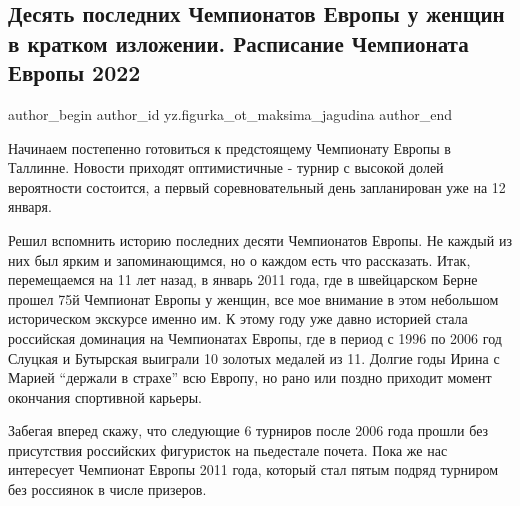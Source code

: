  
 
 
 
 
\subsection{Десять последних Чемпионатов Европы у женщин в кратком изложении. Расписание Чемпионата Европы 2022}
\label{sec:04_01_2022.yz.figurka_ot_maksima_jagudina.1.chempionaty_evropy}


\ifcmt
 author_begin
   author_id yz.figurka_ot_maksima_jagudina
 author_end
\fi

Начинаем постепенно готовиться к предстоящему Чемпионату Европы в Таллинне.
Новости приходят оптимистичные - турнир с высокой долей вероятности состоится,
а первый соревновательный день запланирован уже на 12 января.


Решил вспомнить историю последних десяти Чемпионатов Европы. Не каждый из них
был ярким и запоминающимся, но о каждом есть что рассказать. Итак, перемещаемся
на 11 лет назад, в январь 2011 года, где в швейцарском Берне прошел 75й
Чемпионат Европы у женщин, все мое внимание в этом небольшом историческом
экскурсе именно им. К этому году уже давно историей стала российская доминация
на Чемпионатах Европы, где в период с 1996 по 2006 год Слуцкая и Бутырская
выиграли 10 золотых медалей из 11. Долгие годы Ирина с Марией \enquote{держали в
страхе} всю Европу, но рано или поздно приходит момент окончания спортивной
карьеры.

Забегая вперед скажу, что следующие 6 турниров после 2006 года прошли без
присутствия российских фигуристок на пьедестале почета. Пока же нас интересует
Чемпионат Европы 2011 года, который стал пятым подряд турниром без россиянок в
числе призеров.


